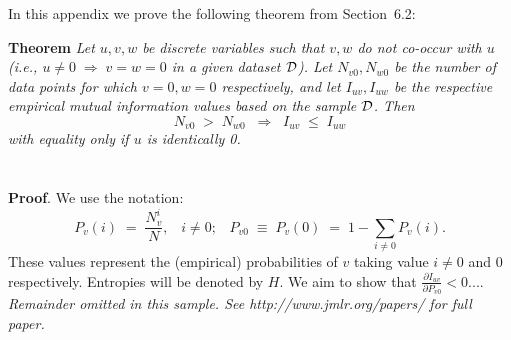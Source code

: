\documentclass[twoside,11pt]{article}
\newcommand{\dataset}{{\cal D}}
\newcommand{\fracpartial}[2]{\frac{\partial #1}{\partial  #2}}
\begin{document}


In this appendix we prove the following theorem from
Section~6.2:

\noindent
{\bf Theorem} {\it Let $u,v,w$ be discrete variables such that $v, w$ do
not co-occur with $u$ (i.e., $u\neq0\;\Rightarrow \;v=w=0$ in a given
dataset $\dataset$). Let $N_{v0},N_{w0}$ be the number of data points for
which $v=0, w=0$ respectively, and let $I_{uv},I_{uw}$ be the
respective empirical mutual information values based on the sample
$\dataset$. Then
\[
	N_{v0} \;>\; N_{w0}\;\;\Rightarrow\;\;I_{uv} \;\leq\;I_{uw}
\]
with equality only if $u$ is identically 0.} \hfill\BlackBox

\section{}

\noindent
{\bf Proof}. We use the notation:
\[
P_v(i) \;=\;\frac{N_v^i}{N},\;\;\;i \neq 0;\;\;\;
P_{v0}\;\equiv\;P_v(0)\; = \;1 - \sum_{i\neq 0}P_v(i).
\]
These values represent the (empirical) probabilities of $v$
taking value $i\neq 0$ and 0 respectively.  Entropies will be denoted
by $H$. We aim to show that $\fracpartial{I_{uv}}{P_{v0}} < 0$....\\

{\noindent \em Remainder omitted in this sample. See http://www.jmlr.org/papers/ for full paper.}


\vskip 0.2in

\end{document}
